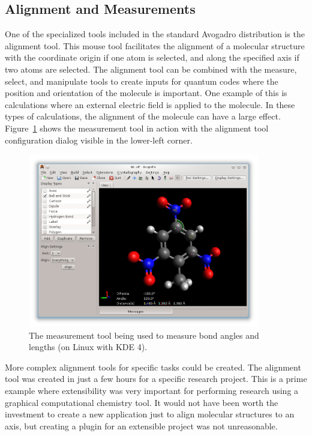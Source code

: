 \documentclass[10pt]{bmc_article}
\newenvironment{bmcformat}{\begin{raggedright}
\baselineskip20pt\sloppy\setboolean{publ}{false}}{\end{raggedright}
\baselineskip20pt\sloppy}
\begin{document}
\begin{bmcformat}
\subsection{Alignment and Measurements}

One of the specialized tools included in the standard Avogadro distribution is
the alignment tool. This mouse tool facilitates the alignment of a molecular
structure with the coordinate origin if one atom is selected, and along the
specified axis if two atoms are selected. The alignment tool can be combined
with the measure, select, and manipulate tools to create inputs for
quantum codes where the position and orientation of the molecule is important.
One example of this is calculations where an external electric field is applied
to the molecule. In these types of calculations, the alignment of the molecule
can have a large effect. Figure~\ref{f:measurement} shows the measurement tool
in action with the alignment tool configuration dialog visible in the lower-left
corner.

\begin{figure}
  \begin{center}
    \includegraphics[width=0.9\textwidth]{images/avogadro-measurement}
  \end{center}
  \caption{The measurement tool being used to measure bond angles and lengths 
  (on Linux with KDE 4).}
  \label{f:measurement}
\end{figure}

More complex alignment tools for specific tasks could be created. The alignment
tool was created in just a few hours for a specific research project. This is a prime
example where extensibility was very important for performing
research using a graphical computational chemistry tool. It would not have been
worth the investment to create a new application just to align molecular
structures to an axis, but creating a plugin for an extensible project was not
unreasonable.



\end{bmcformat}
\end{document}
